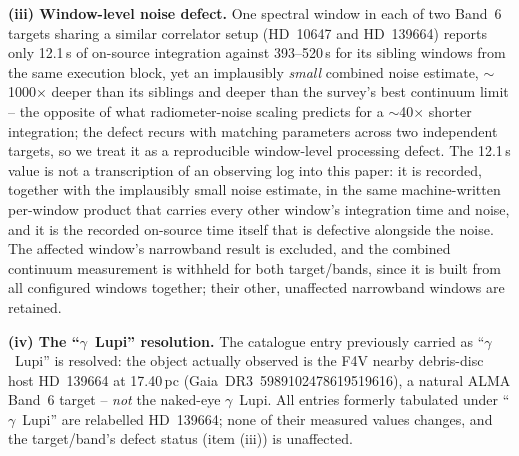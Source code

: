 \documentclass{openjournal}
\begin{document}
\textbf{(iii) Window-level noise defect.} One spectral window in each
of two Band~6 targets sharing a similar correlator setup (HD~10647 and
HD~139664) reports only 12.1\,s of on-source integration against
393--520\,s for its sibling windows from the same execution block, yet
an implausibly \emph{small} combined noise estimate,
$\sim$1000$\times$ deeper than its siblings and deeper than the
survey's best continuum limit -- the opposite of what radiometer-noise
scaling predicts for a $\sim$40$\times$ shorter integration; the
defect recurs with matching parameters across two independent targets,
so we treat it as a reproducible window-level processing defect. The
12.1\,s value is not a transcription of an observing log into this
paper: it is recorded, together with the implausibly small noise
estimate, in the same machine-written per-window product that carries
every other window's integration time and noise, and it is the
recorded on-source time itself that is defective alongside the noise.
The affected window's narrowband result is excluded, and the combined
continuum measurement is withheld for both target/bands, since it is
built from all configured windows together; their other, unaffected
narrowband windows are retained.

\textbf{(iv) The ``$\gamma$~Lupi'' resolution.} The catalogue entry
previously carried as ``$\gamma$~Lupi'' is resolved: the object
actually observed is the F4V nearby debris-disc host HD~139664 at
17.40\,pc (Gaia~DR3~5989102478619519616), a natural ALMA Band~6
target -- \emph{not} the naked-eye $\gamma$~Lupi. All entries formerly
tabulated under ``$\gamma$~Lupi'' are relabelled HD~139664; none of
their measured values changes, and the target/band's defect status
(item (iii)) is unaffected.
\end{document}
